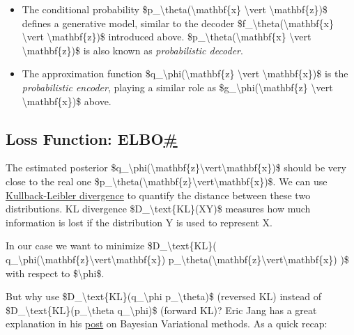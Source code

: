 \begin{itemize}
\tightlist
\item
  The conditional probability \$p\_\textbackslash theta(\textbackslash mathbf\{x\} \textbackslash vert \textbackslash mathbf\{z\})\$ defines a generative model, similar to the decoder \$f\_\textbackslash theta(\textbackslash mathbf\{x\} \textbackslash vert \textbackslash mathbf\{z\})\$ introduced above. \$p\_\textbackslash theta(\textbackslash mathbf\{x\} \textbackslash vert \textbackslash mathbf\{z\})\$ is also known as \emph{probabilistic decoder}.
\item
  The approximation function \$q\_\textbackslash phi(\textbackslash mathbf\{z\} \textbackslash vert \textbackslash mathbf\{x\})\$ is the \emph{probabilistic encoder}, playing a similar role as \$g\_\textbackslash phi(\textbackslash mathbf\{z\} \textbackslash vert \textbackslash mathbf\{x\})\$ above.
\end{itemize}

\subsection{\texorpdfstring{Loss Function: ELBO\hyperref[loss-function-elbo]{\#}}{Loss Function: ELBO\#}}\label{loss-function-elbo}

The estimated posterior \$q\_\textbackslash phi(\textbackslash mathbf\{z\}\textbackslash vert\textbackslash mathbf\{x\})\$ should be very close to the real one \$p\_\textbackslash theta(\textbackslash mathbf\{z\}\textbackslash vert\textbackslash mathbf\{x\})\$. We can use \href{https://en.wikipedia.org/wiki/Kullback\%E2\%80\%93Leibler_divergence}{Kullback-Leibler divergence} to quantify the distance between these two distributions. KL divergence \$D\_\textbackslash text\{KL\}(X\textbar Y)\$ measures how much information is lost if the distribution Y is used to represent X.

In our case we want to minimize \$D\_\textbackslash text\{KL\}( q\_\textbackslash phi(\textbackslash mathbf\{z\}\textbackslash vert\textbackslash mathbf\{x\}) \textbar{} p\_\textbackslash theta(\textbackslash mathbf\{z\}\textbackslash vert\textbackslash mathbf\{x\}) )\$ with respect to \$\textbackslash phi\$.

But why use \$D\_\textbackslash text\{KL\}(q\_\textbackslash phi \textbar{} p\_\textbackslash theta)\$ (reversed KL) instead of \$D\_\textbackslash text\{KL\}(p\_\textbackslash theta \textbar{} q\_\textbackslash phi)\$ (forward KL)? Eric Jang has a great explanation in his \href{https://blog.evjang.com/2016/08/variational-bayes.html}{post} on Bayesian Variational methods. As a quick recap:

